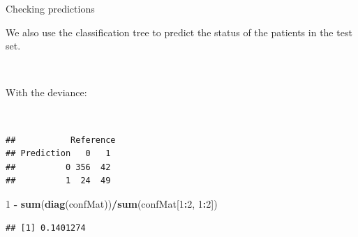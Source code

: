 \documentclass[10pt,ignorenonframetext,]{beamer}
\newenvironment{Shaded}{\begin{snugshade}}{\end{snugshade}}
\newcommand{\KeywordTok}[1]{\textcolor[rgb]{0.13,0.29,0.53}{\textbf{#1}}}
\newcommand{\DataTypeTok}[1]{\textcolor[rgb]{0.13,0.29,0.53}{#1}}
\newcommand{\DecValTok}[1]{\textcolor[rgb]{0.00,0.00,0.81}{#1}}
\newcommand{\StringTok}[1]{\textcolor[rgb]{0.31,0.60,0.02}{#1}}
\newcommand{\OperatorTok}[1]{\textcolor[rgb]{0.81,0.36,0.00}{\textbf{#1}}}
\newcommand{\NormalTok}[1]{#1}
\begin{document}
\begin{frame}[fragile]

\begin{block}{Checking predictions}

\vspace{2mm}

We also use the classification tree to predict the status of the
patients in the test set.

\(~\)

With the deviance:

\(~\)

\tiny

\begin{Shaded}
\end{Shaded}

\begin{verbatim}
##           Reference
## Prediction   0   1
##          0 356  42
##          1  24  49
\end{verbatim}

\begin{Shaded}
\begin{Highlighting}[]
\DecValTok{1} \OperatorTok{-}\StringTok{ }\KeywordTok{sum}\NormalTok{(}\KeywordTok{diag}\NormalTok{(confMat))}\OperatorTok{/}\KeywordTok{sum}\NormalTok{(confMat[}\DecValTok{1}\OperatorTok{:}\DecValTok{2}\NormalTok{, }\DecValTok{1}\OperatorTok{:}\DecValTok{2}\NormalTok{])}
\end{Highlighting}
\end{Shaded}

\begin{verbatim}
## [1] 0.1401274
\end{verbatim}

\end{block}

\end{frame}
\end{document}
